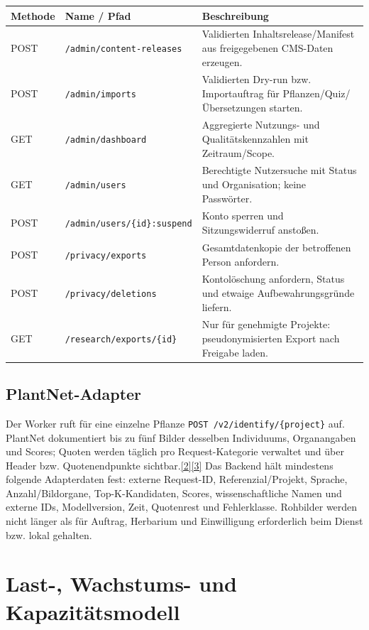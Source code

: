 \documentclass[10pt,a4paper,oneside]{article}
\newcommand{\Src}[1]{\hyperlink{src:#1}{\textcolor{Forest}{[#1]}}}
\newcommand{\Code}[1]{\texttt{\small #1}}
\begin{document}
\begin{longtable}{@{}p{14mm}p{54mm}p{92mm}@{}}
\toprule
\textbf{Methode} & \textbf{Name / Pfad} & \textbf{Beschreibung} \\
\midrule
\endhead
POST & \Code{/admin/content-releases} & Validierten Inhaltsrelease/Manifest aus freigegebenen CMS-Daten erzeugen. \\
POST & \Code{/admin/imports} & Validierten Dry-run bzw. Importauftrag für Pflanzen/Quiz/Übersetzungen starten. \\
GET & \Code{/admin/dashboard} & Aggregierte Nutzungs- und Qualitätskennzahlen mit Zeitraum/Scope. \\
GET & \Code{/admin/users} & Berechtigte Nutzersuche mit Status und Organisation; keine Passwörter. \\
POST & \Code{/admin/users/\{id\}:suspend} & Konto sperren und Sitzungswiderruf anstoßen. \\
POST & \Code{/privacy/exports} & Gesamtdatenkopie der betroffenen Person anfordern. \\
POST & \Code{/privacy/deletions} & Kontolöschung anfordern, Status und etwaige Aufbewahrungsgründe liefern. \\
GET & \Code{/research/exports/\{id\}} & Nur für genehmigte Projekte: pseudonymisierten Export nach Freigabe laden. \\
\bottomrule
\end{longtable}
\normalsize

\subsection{PlantNet-Adapter}

Der Worker ruft für eine einzelne Pflanze \Code{POST /v2/identify/\{project\}} auf. PlantNet dokumentiert bis zu fünf Bilder desselben Individuums, Organangaben und Scores; Quoten werden täglich pro Request-Kategorie verwaltet und über Header bzw. Quotenendpunkte sichtbar.\Src{2}\Src{3} Das Backend hält mindestens folgende Adapterdaten fest: externe Request-ID, Referenzial/Projekt, Sprache, Anzahl/Bildorgane, Top-K-Kandidaten, Scores, wissenschaftliche Namen und externe IDs, Modellversion, Zeit, Quotenrest und Fehlerklasse. Rohbilder werden nicht länger als für Auftrag, Herbarium und Einwilligung erforderlich beim Dienst bzw. lokal gehalten.

\section{Last-, Wachstums- und Kapazitätsmodell}\label{sec:load}
\end{document}
